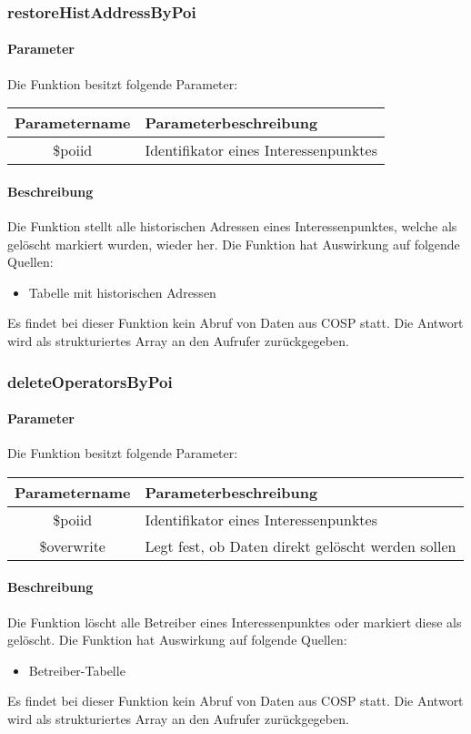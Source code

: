 \subsubsection{restoreHistAddressByPoi}
\paragraph{Parameter} Die Funktion besitzt folgende Parameter:
\begin{table}[H]
	\begin{tabular}{|c|p{11cm}|}
		\hline
		\textbf{Parametername} & \textbf{Parameterbeschreibung} \\ \hline
		\$poiid     & Identifikator eines Interessenpunktes \\ \hline
	\end{tabular}
\end{table}
\paragraph{Beschreibung} Die Funktion stellt alle historischen Adressen eines Interessenpunktes, welche als gelöscht markiert wurden, wieder her. Die Funktion hat Auswirkung auf folgende Quellen:
\begin{itemize}
	\item Tabelle mit historischen Adressen
\end{itemize}
Es findet bei dieser Funktion kein Abruf von Daten aus {\glqq COSP\grqq} statt. Die Antwort wird als strukturiertes Array an den Aufrufer zurückgegeben.
\subsubsection{deleteOperatorsByPoi}
\paragraph{Parameter} Die Funktion besitzt folgende Parameter:
\begin{table}[H]
	\begin{tabular}{|c|p{11cm}|}
		\hline
		\textbf{Parametername} & \textbf{Parameterbeschreibung} \\ \hline
		\$poiid     & Identifikator eines Interessenpunktes \\ \hline
		\$overwrite & Legt fest, ob Daten direkt gelöscht werden sollen \\ \hline
	\end{tabular}
\end{table}
\paragraph{Beschreibung} Die Funktion löscht alle Betreiber eines Interessenpunktes oder markiert diese als gelöscht. Die Funktion hat Auswirkung auf folgende Quellen:
\begin{itemize}
	\item Betreiber-Tabelle
\end{itemize}
Es findet bei dieser Funktion kein Abruf von Daten aus {\glqq COSP\grqq} statt. Die Antwort wird als strukturiertes Array an den Aufrufer zurückgegeben.
